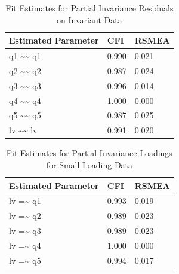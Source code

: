 \documentclass[
  man,floatsintext]{apa7}
\begin{document}
\begin{table}[tbp]

\begin{center}
\begin{threeparttable}

\caption{\label{tab:p-tab11}Fit Estimates for Partial Invariance Residuals on Invariant Data}

\begin{tabular}{lll}
\toprule
Estimated Parameter & CFI & RSMEA\\
\midrule
q1 \textasciitilde{}\textasciitilde{} q1 & 0.990 & 0.021\\
q2 \textasciitilde{}\textasciitilde{} q2 & 0.987 & 0.024\\
q3 \textasciitilde{}\textasciitilde{} q3 & 0.996 & 0.014\\
q4 \textasciitilde{}\textasciitilde{} q4 & 1.000 & 0.000\\
q5 \textasciitilde{}\textasciitilde{} q5 & 0.987 & 0.025\\
lv \textasciitilde{}\textasciitilde{} lv & 0.991 & 0.020\\
\bottomrule
\end{tabular}

\end{threeparttable}
\end{center}

\end{table}

\begin{table}[tbp]

\begin{center}
\begin{threeparttable}

\caption{\label{tab:p-tab12}Fit Estimates for Partial Invariance Loadings for Small Loading Data}

\begin{tabular}{lll}
\toprule
Estimated Parameter & CFI & RSMEA\\
\midrule
lv =\textasciitilde{} q1 & 0.993 & 0.019\\
lv =\textasciitilde{} q2 & 0.989 & 0.023\\
lv =\textasciitilde{} q3 & 0.989 & 0.023\\
lv =\textasciitilde{} q4 & 1.000 & 0.000\\
lv =\textasciitilde{} q5 & 0.994 & 0.017\\
\bottomrule
\end{tabular}

\end{threeparttable}
\end{center}

\end{table}
\end{document}
